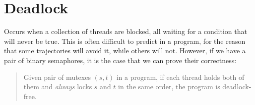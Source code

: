 \documentclass[fleqn]{article}
\begin{document}
\section{Deadlock}

Occurs when a collection of threads are blocked, all waiting for a condition that will never be true. This is often difficult to predict in a program, for the reason that some trajectories will avoid it, while others will not. However, if we have a pair of binary semaphores, it is the case that we can prove their correctness:

\begin{quote}
Given pair of mutexes $(s,t)$ in a program, if each thread holds both of them and \textit{always} locks $s$ and $t$ in the same order, the program is deadlock-free.
\end{quote}
\end{document}
